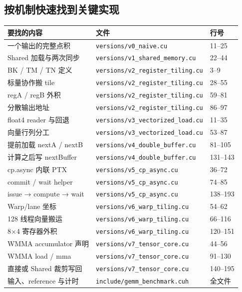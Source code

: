 \documentclass[UTF8,11pt,a4paper,fontset=fandol]{ctexart}
\newcommand{\code}[1]{\nolinkurl{#1}}
\begin{document}
\subsection{按机制快速找到关键实现}
\begin{longtable}{p{4.4cm}p{6.6cm}p{2.8cm}}
\toprule
要找的内容 & 文件 & 行号\\\midrule
\endhead
一个输出的完整点积 & \code{versions/v0_naive.cu} & 11--25\\
Shared 加载与两次同步 & \code{versions/v1_shared_memory.cu} & 22--44\\
BK / TM / TN 定义 & \code{versions/v2_register_tiling.cu} & 3--9\\
标量协作搬 tile & \code{versions/v2_register_tiling.cu} & 28--55\\
regA / regB 外积 & \code{versions/v2_register_tiling.cu} & 59--81\\
分散输出地址 & \code{versions/v2_register_tiling.cu} & 86--97\\
float4 reader 与回退 & \code{versions/v3_vectorized_load.cu} & 11--35\\
向量行列分工 & \code{versions/v3_vectorized_load.cu} & 53--87\\
提前加载 nextA / nextB & \code{versions/v4_double_buffer.cu} & 81--105\\
计算之后写 nextBuffer & \code{versions/v4_double_buffer.cu} & 131--143\\
cp.async 内联 PTX & \code{versions/v5_cp_async.cu} & 36--72\\
commit / wait helper & \code{versions/v5_cp_async.cu} & 74--85\\
issue → compute → wait & \code{versions/v5_cp_async.cu} & 138--193\\
Warp/lane 坐标 & \code{versions/v6_warp_tiling.cu} & 54--62\\
128 线程向量搬运 & \code{versions/v6_warp_tiling.cu} & 66--116\\
8×4 寄存器外积 & \code{versions/v6_warp_tiling.cu} & 120--151\\
WMMA accumulator 声明 & \code{versions/v7_tensor_core.cu} & 44--56\\
WMMA load / mma & \code{versions/v7_tensor_core.cu} & 91--130\\
直接或 Shared 裁剪写回 & \code{versions/v7_tensor_core.cu} & 140--195\\
输入、reference 与计时 & \code{include/gemm_benchmark.cuh} & 全文件\\\bottomrule
\end{longtable}
\end{document}
